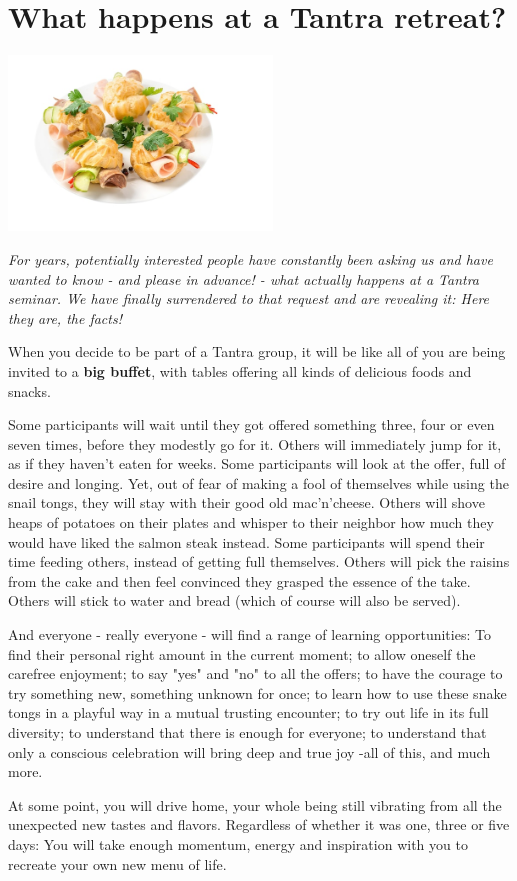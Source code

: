 \section{What happens at a Tantra retreat?}

\begin{center}
\includegraphics[width=7cm]{images/02_happens.jpg}
\end{center}

\textit{For years, potentially interested people have constantly been asking us and have wanted to know - and please in advance! - what actually happens at a Tantra seminar. We have finally surrendered to that request and are revealing it: Here they are, the facts!}

When you decide to be part of a Tantra group, it will be like all of you are being invited to a \textbf{big buffet}, with tables offering all kinds of delicious foods and snacks.

Some participants will wait until they got offered something three, four or even seven times, before they modestly go for it. Others will immediately jump for it, as if they haven't eaten for weeks. Some participants will look at the offer, full of desire and longing. Yet, out of fear of making a fool of themselves while using the snail tongs, they will stay with their good old mac'n'cheese. Others will shove heaps of potatoes on their plates and whisper to their neighbor how much they would have liked the salmon steak instead. Some participants will spend their time feeding others, instead of getting full themselves. Others will pick the raisins from the cake and then feel convinced they grasped the essence of the take. Others will stick to water and bread (which of course will also be served).

And everyone - really everyone - will find a range of learning opportunities: To find their personal right amount in the current moment; to allow oneself the carefree enjoyment; to say "yes" and "no" to all the offers; to have the courage to try something new, something unknown for once; to learn how to use these snake tongs in a playful way in a mutual trusting encounter; to try out life in its full diversity; to understand that there is enough for everyone; to understand that only a conscious celebration will bring deep and true joy -all of this, and much more.

At some point, you will drive home, your whole being still vibrating from all the unexpected new tastes and flavors. Regardless of whether it was one, three or five days: You will take enough momentum, energy and inspiration with you to recreate your own new menu of life.
